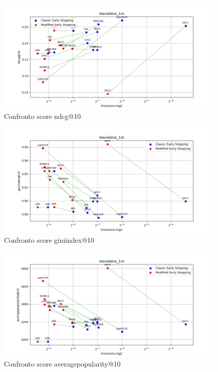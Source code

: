 \begin{figure}[H]
    \centering
    \includegraphics[width=\linewidth, trim=0 0 0 0]{images/ndcg@10_movielens_1m_40_5_comparison.png}
    \caption{Confronto score ndcg@10}
    
\end{figure}

\begin{figure}[H]
    \centering
    \includegraphics[width=\linewidth, trim=0 0 0 0]{images/giniindex@10_movielens_1m_40_5_comparison.png}
    \caption{Confronto score giniindex@10}
\end{figure}

\begin{figure}[H]
    \centering
    \includegraphics[width=\linewidth, trim=0 0 0 0]{images/averagepopularity@10_movielens_1m_40_5_comparison.png}
    \caption{Confronto score averagepopularity@10}
\end{figure}


